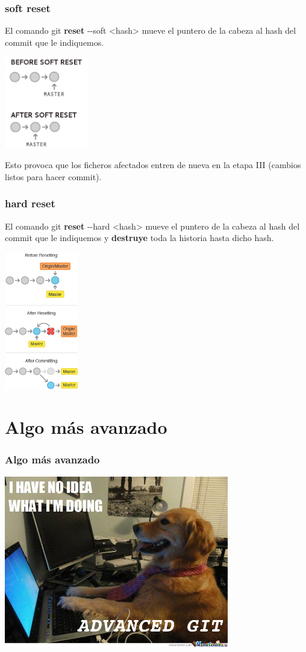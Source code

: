 \frame
{
\frametitle{soft reset}
 El comando git \textbf{reset} -{}-soft <hash> mueve el puntero de la cabeza al hash del commit que le indiquemos.\\
 \begin{center}
    \includegraphics[height=4cm]{imgs/soft-reset.png}
 \end{center}
 
 Esto provoca que los ficheros afectados entren de nueva en la etapa III (cambios listos para hacer commit).
}

\frame
{
\frametitle{hard reset}
 El comando git \textbf{reset} -{}-hard <hash> mueve el puntero de la cabeza al hash del commit que le indiquemos y \textbf{destruye} toda la historia hasta dicho hash.\\
 \begin{center}
    \includegraphics[height=6cm]{imgs/reset-hard.png}
 \end{center}
}

\section{Algo más avanzado}
\frame
{
\frametitle{Algo más avanzado}
\begin{center}
  \includegraphics[height=7.5cm]{imgs/noidea.jpg}
\end{center}
}

